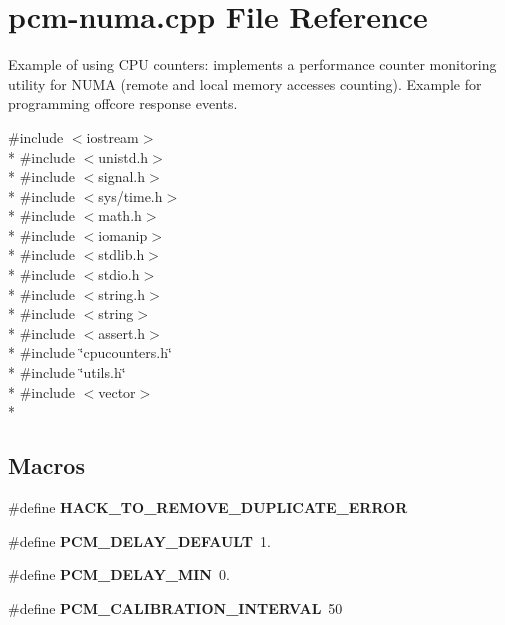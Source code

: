 \section{pcm-\/numa.cpp File Reference}
\label{pcm-numa_8cpp}


Example of using C\+PU counters\+: implements a performance counter monitoring utility for N\+U\+MA (remote and local memory accesses counting). Example for programming offcore response events.  


{\ttfamily \#include $<$iostream$>$}\\*
{\ttfamily \#include $<$unistd.\+h$>$}\\*
{\ttfamily \#include $<$signal.\+h$>$}\\*
{\ttfamily \#include $<$sys/time.\+h$>$}\\*
{\ttfamily \#include $<$math.\+h$>$}\\*
{\ttfamily \#include $<$iomanip$>$}\\*
{\ttfamily \#include $<$stdlib.\+h$>$}\\*
{\ttfamily \#include $<$stdio.\+h$>$}\\*
{\ttfamily \#include $<$string.\+h$>$}\\*
{\ttfamily \#include $<$string$>$}\\*
{\ttfamily \#include $<$assert.\+h$>$}\\*
{\ttfamily \#include \char`\"{}cpucounters.\+h\char`\"{}}\\*
{\ttfamily \#include \char`\"{}utils.\+h\char`\"{}}\\*
{\ttfamily \#include $<$vector$>$}\\*
\subsection*{Macros}
\begin{DoxyCompactItemize}
\item 
\#define {\bfseries H\+A\+C\+K\+\_\+\+T\+O\+\_\+\+R\+E\+M\+O\+V\+E\+\_\+\+D\+U\+P\+L\+I\+C\+A\+T\+E\+\_\+\+E\+R\+R\+OR}\label{pcm-numa_8cpp_ac4eeb11d89b0f517835a12a04443ebe4}

\item 
\#define {\bfseries P\+C\+M\+\_\+\+D\+E\+L\+A\+Y\+\_\+\+D\+E\+F\+A\+U\+LT}~1.\label{pcm-numa_8cpp_aa9ecc55c90c7a69729babc4f5f91ed96}

\item 
\#define {\bfseries P\+C\+M\+\_\+\+D\+E\+L\+A\+Y\+\_\+\+M\+IN}~0.\label{pcm-numa_8cpp_acccbe8441d6dd75bdc949f5f0ee126c5}

\item 
\#define {\bfseries P\+C\+M\+\_\+\+C\+A\+L\+I\+B\+R\+A\+T\+I\+O\+N\+\_\+\+I\+N\+T\+E\+R\+V\+AL}~50\label{pcm-numa_8cpp_a433dde946b6713059756318598c9a6fe}

\end{DoxyCompactItemize}
